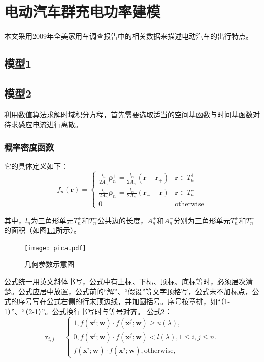 \documentclass[bachelor]{NCEPU-thesis}
\begin{document}
\chapter{电动汽车群充电功率建模}
本文采用2009年全美家用车调查报告中的相关数据来描述电动汽车的出行特点。

\section{模型1}

\section{模型2}
利用数值算法求解时域积分方程，首先需要选取适当的空间基函数与时间基函数对待求感应电流进行离散。

\subsection{概率密度函数}
它的具体定义如下：
\begin{equation}
f_n(\bm{r})=
\begin{cases}
\frac{l_n}{2A_n^+}\bm{\rho}_n^+=\frac{l_n}{2A_n^+}(\bm{r}-\bm{r}_+)&\bm{r}\in T_n^+\\
\frac{l_n}{2A_n^-}\bm{\rho}_n^-=\frac{l_n}{2A_n^-}(\bm{r}_--\bm{r})&\bm{r}\in T_n^-\\
0&\text{otherwise}
\end{cases}
\end{equation}

其中，$l_n$为三角形单元$T_n^+$和$T_n^-$公共边的长度，$A_n^+$和$A_n^-$分别为三角形单元$T_n^+$和$T_n^-$的面积（如图\ref{pica}所示）。

\begin{figure}[h]
	\texttt{[image: pica.pdf]}
	\caption{几何参数示意图}
	\label{pica}
\end{figure}

公式统一用英文斜体书写，公式中有上标、下标、顶标、底标等时，必须层次清楚。公式应居中放置，公式前的“解”、“假设”等文字顶格写，公式末不加标点，公式的序号写在公式右侧的行末顶边线，并加圆括号。序号按章排，如“（1-1）”、“（2-1）”。公式换行书写时与等号对齐。
公式2：
\begin{equation}
\label{latent_binary_variable}
\bm{r}_{i,j}=
\begin{cases}
1,f(\bm{x}^{i};\bm{w})\cdot f(\bm{x}^{j};\bm{w})\geq u(\lambda),\\
0,f(\bm{x}^{i};\bm{w})\cdot f(\bm{x}^{j};\bm{w})< l(\lambda), 1\leq i,j\leq n.\\
f(\bm{x}^{i};\bm{w})\cdot f(\bm{x}^{j};\bm{w}),\text{otherwise},
\end{cases}
\end{equation}
\end{document}
